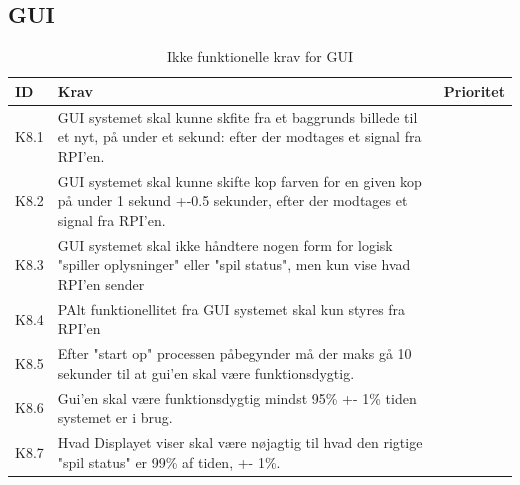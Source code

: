 \documentclass[Kravspecifikation/Kravspec_Main.tex]{subfiles}
\begin{document}
\subsection{GUI}
\begin{table}[H]
\centering
\begin{tabular}{|L{0.1\textwidth}|L{0.65\textwidth}|L{0.15\textwidth}|}
\hline
\textbf{ID} & \textbf{Krav} & \textbf{Prioritet} \\ \hline
K8.1 & GUI systemet skal kunne skfite fra et baggrunds billede til et nyt, på under et sekund: efter der modtages et signal fra RPI'en.  & \\ \hline
K8.2 & GUI systemet skal kunne skifte kop farven for en given kop på under 1 sekund +-0.5 sekunder, efter der modtages et signal fra RPI'en. & \\ \hline
K8.3 & GUI systemet skal ikke håndtere nogen form for logisk "spiller oplysninger" eller "spil status", men kun vise hvad RPI'en sender & \\ \hline
K8.4 & PAlt funktionellitet fra GUI systemet skal kun styres fra RPI'en & \\ \hline
K8.5 & Efter "start op" processen påbegynder må der maks gå 10 sekunder til at gui'en skal være funktionsdygtig. & \\ \hline
K8.6 & Gui'en skal være funktionsdygtig mindst 95\% +- 1\% tiden systemet er i brug. & \\ \hline
K8.7 & Hvad Displayet viser skal være nøjagtig til hvad den rigtige "spil status" er 99\%  af tiden, +- 1\%. & \\ \hline
\end{tabular}
\caption{Ikke funktionelle krav for GUI}
\label{tab:GUI}
\end{table}
\end{document}
